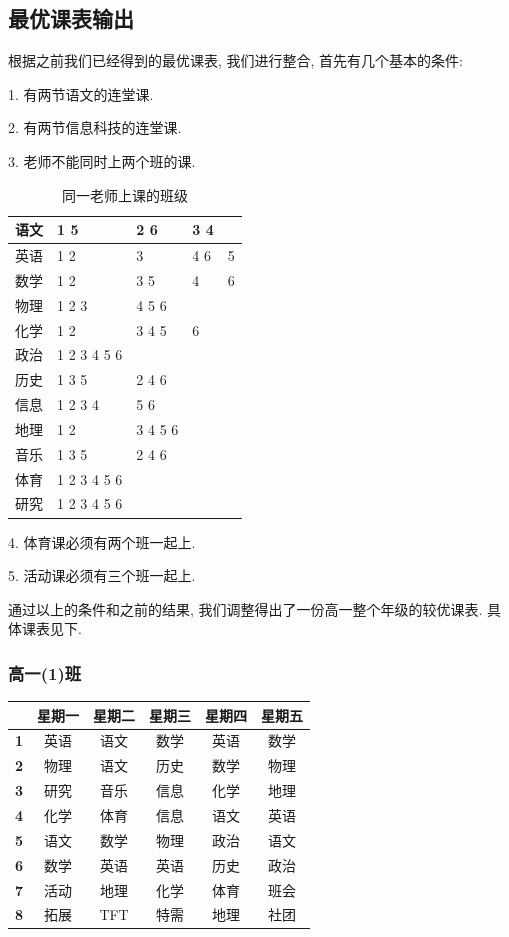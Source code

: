 \documentclass[a4paper]{article}
\begin{document}
 \subsection{最优课表输出}
  根据之前我们已经得到的最优课表, 我们进行整合, 首先有几个基本的条件:\par
  1. 有两节语文的连堂课.\par
  2. 有两节信息科技的连堂课.\par
  3. 老师不能同时上两个班的课.\par
  \begin{table}[H]
  \centering
  \begin{tabular}{|l|p{50pt}p{50pt}p{50pt}p{50pt}|}
  \hline
  语文 & 1 5 & 2 6 & 3 4 & \\\hline
  英语 & 1 2 & 3 & 4 6 & 5 \\\hline
  数学 & 1 2 & 3 5 & 4 & 6 \\\hline
  物理 & 1 2 3 & 4 5 6 & & \\\hline
  化学 & 1 2 & 3 4 5 & 6 & \\\hline
  政治 & 1 2 3 4 5 6 & & & \\\hline
  历史 & 1 3 5 & 2 4 6 & & \\\hline
  信息 & 1 2 3 4 & 5 6 & & \\\hline
  地理 & 1 2 & 3 4 5 6 & & \\\hline
  音乐 & 1 3 5 & 2 4 6 & & \\\hline
  体育 & 1 2 3 4 5 6 & & & \\\hline
  研究 & 1 2 3 4 5 6 & & & \\\hline
  \end{tabular}
  \caption{同一老师上课的班级}
  \end{table}
  4. 体育课必须有两个班一起上.\par
  5. 活动课必须有三个班一起上.\par
  通过以上的条件和之前的结果, 我们调整得出了一份高一整个年级的较优课表. 具体课表见下.
  \clearpage
  \subsubsection{高一(1)班}
   \begin{tabular}{|c|c|c|c|c|c|}
   \hline
   & \bf 星期一 & \bf 星期二 & \bf 星期三 & \bf 星期四 & \bf 星期五 \\\hline
   \bf 1 & 英语 & 语文 & 数学 & 英语 & 数学 \\\hline
   \bf 2 & 物理 & 语文 & 历史 & 数学 & 物理 \\\hline
   \bf 3 & 研究 & 音乐 & 信息 & 化学 & 地理 \\\hline
   \bf 4 & 化学 & 体育 & 信息 & 语文 & 英语 \\\hline
   \bf 5 & 语文 & 数学 & 物理 & 政治 & 语文 \\\hline
   \bf 6 & 数学 & 英语 & 英语 & 历史 & 政治 \\\hline
   \bf 7 & 活动 & 地理 & 化学 & 体育 & 班会 \\\hline
   \bf 8 & 拓展 & TFT  & 特需 & 地理 & 社团 \\\hline
   \end{tabular}
\end{document}
